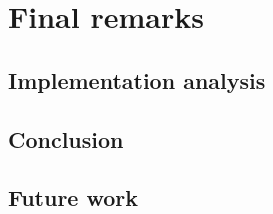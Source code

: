 \chapter{Final remarks}
\minitoc
\label{chapter-future}

\section{Implementation analysis}


\section{Conclusion}

\section{Future work}


